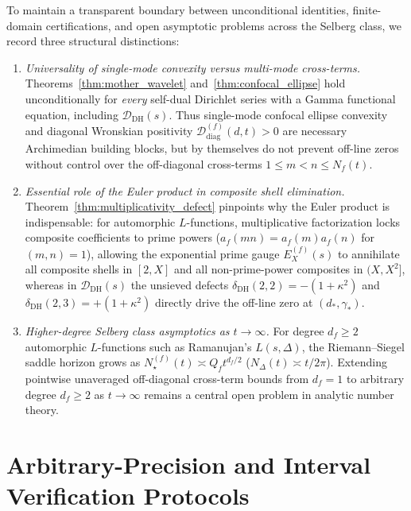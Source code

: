 \documentclass[11pt,reqno]{amsart}
\theoremstyle{definition}
\theoremstyle{remark}
\numberwithin{equation}{section}
\newcommand{\DHf}{\mathrm{DH}}
\begin{document}
To maintain a transparent boundary between unconditional identities, finite-domain certifications, and open asymptotic problems across the Selberg class, we record three structural distinctions:
\begin{enumerate}[label=\textup{(\arabic*)},leftmargin=2.2em]
\item \textit{Universality of single-mode convexity versus multi-mode cross-terms.} Theorems~\ref{thm:mother_wavelet} and~\ref{thm:confocal_ellipse} hold unconditionally for \emph{every} self-dual Dirichlet series with a Gamma functional equation, including $\mathcal{D}_{\DHf}(s)$. Thus single-mode confocal ellipse convexity and diagonal Wronskian positivity $\mathcal{D}_{\mathrm{diag}}^{(f)}(d,t) > 0$ are necessary Archimedian building blocks, but by themselves do not prevent off-line zeros without control over the off-diagonal cross-terms $1 \le m < n \le N_f(t)$.
\item \textit{Essential role of the Euler product in composite shell elimination.} Theorem~\ref{thm:multiplicativity_defect} pinpoints why the Euler product is indispensable: for automorphic $L$-functions, multiplicative factorization locks composite coefficients to prime powers ($a_f(mn) = a_f(m)a_f(n)$ for $(m,n)=1$), allowing the exponential prime gauge $E_X^{(f)}(s)$ to annihilate all composite shells in $[2, X]$ and all non-prime-power composites in $(X, X^2]$, whereas in $\mathcal{D}_{\DHf}(s)$ the unsieved defects $\delta_{\DHf}(2,2) = -(1+\kappa^2)$ and $\delta_{\DHf}(2,3) = +(1+\kappa^2)$ directly drive the off-line zero at $(d_*, \gamma_*)$.
\item \textit{Higher-degree Selberg class asymptotics as $t \to \infty$.} For degree $d_f \ge 2$ automorphic $L$-functions such as Ramanujan's $L(s,\Delta)$, the Riemann--Siegel saddle horizon grows as $N_\star^{(f)}(t) \asymp Q_f t^{d_f/2}$ ($N_\Delta(t) \asymp t/2\pi$). Extending pointwise unaveraged off-diagonal cross-term bounds from $d_f = 1$ to arbitrary degree $d_f \ge 2$ as $t \to \infty$ remains a central open problem in analytic number theory.
\end{enumerate}

\appendix
\section{Arbitrary-Precision and Interval Verification Protocols}\label{app:verification}
\end{document}
